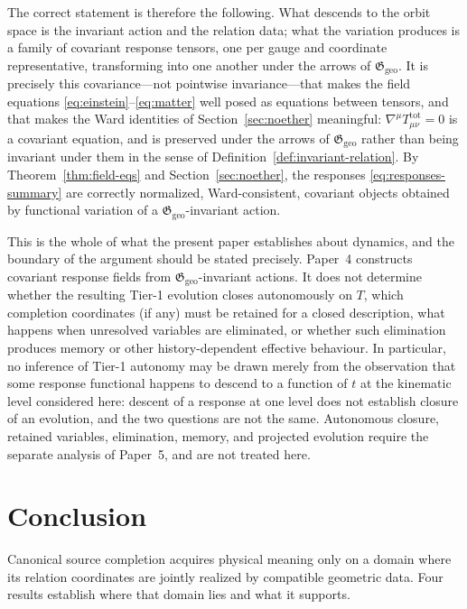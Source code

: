 \documentclass[11pt,a4paper]{article}
\theoremstyle{plain}
\theoremstyle{definition}
\theoremstyle{remark}
\newcommand{\Ggeo}{\mathfrak{G}_{\mathrm{geo}}}
\begin{document}
The correct statement is therefore the following. What descends to the orbit space is the invariant
action and the relation data; what the variation produces is a family of covariant response tensors,
one per gauge and coordinate representative, transforming into one another under the arrows of
$\Ggeo$. It is precisely this covariance---not pointwise invariance---that makes the field equations
\eqref{eq:einstein}--\eqref{eq:matter} well posed as equations between tensors, and that makes the
Ward identities of Section~\ref{sec:noether} meaningful: $\nabla^{\mu}T^{\mathrm{tot}}_{\mu\nu}=0$
is a covariant equation, and is preserved under the arrows of $\Ggeo$ rather than being invariant
under them in the sense of Definition~\ref{def:invariant-relation}. By
Theorem~\ref{thm:field-eqs} and Section~\ref{sec:noether}, the responses
\eqref{eq:responses-summary} are correctly normalized, Ward-consistent, covariant objects obtained
by functional variation of a $\Ggeo$-invariant action.

This is the whole of what the present paper establishes about dynamics, and the boundary of the
argument should be stated precisely. Paper~4 constructs covariant response fields from
$\Ggeo$-invariant actions. It does not determine whether the resulting Tier-1 evolution closes autonomously on $T$, which
completion coordinates (if any) must be retained for a closed description, what happens when
unresolved variables are eliminated, or whether such elimination produces memory or other
history-dependent effective behaviour. In particular, no inference of Tier-1 autonomy may be drawn
merely from the observation that some response functional happens to descend to a function of $t$ at
the kinematic level considered here: descent of a response at one level does not establish closure of
an evolution, and the two questions are not the same. Autonomous closure, retained variables,
elimination, memory, and projected evolution require the separate analysis of Paper~5, and are not
treated here.

\section{Conclusion}
\label{sec:conclusion}

Canonical source completion acquires physical meaning only on a domain where its relation
coordinates are jointly realized by compatible geometric data. Four results establish where that
domain lies and what it supports.
\end{document}
